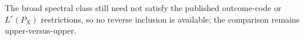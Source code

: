 The broad spectral class still need not satisfy the published outcome-code or \(L^r(P_X)\) restrictions, so no reverse inclusion is available; the comparison remains upper-versus-upper.